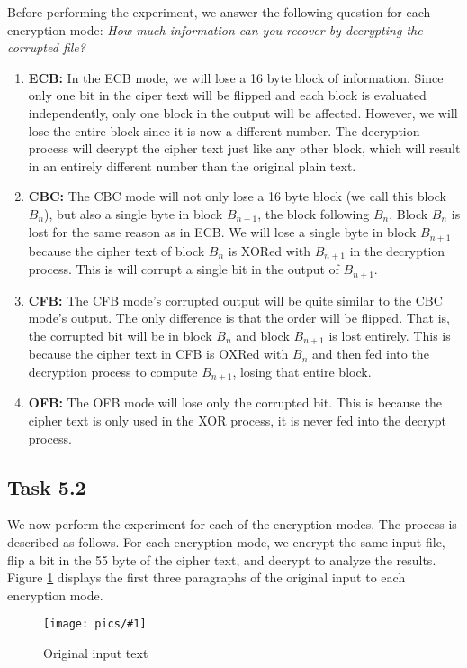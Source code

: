 \documentclass[11pt]{article}
\newcommand{\fig}[2]{ 
\begin{figure}[h]
	\centering
	\caption{#2}
	\texttt{[image: pics/\#1]}
	\label{fig:#1}
\end{figure} 
}
\begin{document}
Before performing the experiment, we answer the following question for each encryption mode: \textit{How much information can you recover by decrypting the corrupted file?}
\begin{enumerate}
	\item \textbf{ECB: } In the ECB mode, we will lose a 16 byte block of information. Since only one bit in the ciper text will be flipped and each block is evaluated independently, only one block in the output will be affected. However, we will lose the entire block since it is now a different number. The decryption process will decrypt the cipher text just like any other block, which will result in an entirely different number than the original plain text.
	\item \textbf{CBC: } The CBC mode will not only lose a 16 byte block (we call this block $B_n$), but also a single byte in block $B_{n+1}$, the block following $B_n$. Block $B_n$ is lost for the same reason as in ECB. We will lose a single byte in block $B_{n+1}$ because the cipher text of block $B_n$ is XORed with $B_{n+1}$ in the decryption process. This is will corrupt a single bit in the output of $B_{n+1}$.
	\item \textbf{CFB: } The CFB mode's corrupted output will be quite similar to the CBC mode's output. The only difference is that the order will be flipped. That is, the corrupted bit will be in block $B_n$ and block $B_{n+1}$ is lost entirely. This is because the cipher text in CFB is OXRed with $B_n$ and then fed into the decryption process to compute $B_{n+1}$, losing that entire block.
	\item \textbf{OFB: } The OFB mode will lose only the corrupted bit. This is because the cipher text is only used in the XOR process, it is never fed into the decrypt process.
\end{enumerate}

\subsection*{Task 5.2}

We now perform the experiment for each of the encryption modes. The process is described as follows. For each encryption mode, we encrypt the same input file, flip a bit in the 55 byte of the cipher text, and decrypt to analyze the results. Figure \ref{fig:task5.2.0} displays the first three paragraphs of the original input to each encryption mode.

\fig{task5.2.0}{Original input text}
\end{document}
